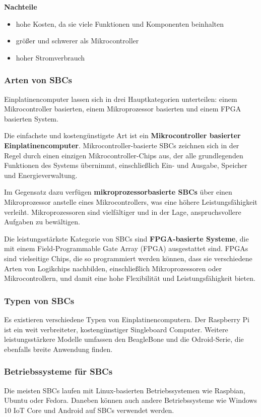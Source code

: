 \textbf{Nachteile}
\begin{itemize}
	\item hohe Kosten, da sie viele Funktionen und Komponenten beinhalten
	\item größer und schwerer als Mikrocontroller
	\item hoher Stromverbrauch
\end{itemize}

\subsubsection{Arten von SBCs}
Einplatinencomputer lassen sich in drei Hauptkategorien unterteilen: einem Mikrocontroller basierten, einem Mikroprozessor basierten und einem FPGA basierten System. 

Die einfachste und kostengünstigste Art ist ein \textbf{Mikrocontroller basierter Einplatinencomputer}. Mikrocontroller-basierte SBCs zeichnen sich in der Regel durch einen einzigen Mikrocontroller-Chips aus, der alle grundlegenden Funktionen des Systems übernimmt, einschließlich Ein- und Ausgabe, Speicher und Energieverwaltung. 

Im Gegensatz dazu verfügen \textbf{mikroprozessorbasierte SBCs} über einen Mikroprozessor anstelle eines Mikrocontrollers, was eine höhere Leistungsfähigkeit verleiht. Mikroprozessoren sind vielfältiger und in der Lage, anspruchsvollere Aufgaben zu bewältigen. 

Die leistungsstärkste Kategorie von SBCs sind \textbf{FPGA-basierte Systeme}, die mit einem Field-Programmable Gate Array (FPGA) ausgestattet sind. FPGAs sind vielseitige Chips, die so programmiert werden können, dass sie verschiedene Arten von Logikchips nachbilden, einschließlich Mikroprozessoren oder Mikrocontrollern, und damit eine hohe Flexibilität und Leistungsfähigkeit bieten.

\subsubsection{Typen von SBCs}
Es existieren verschiedene Typen von Einplatinencomputern. Der Raspberry Pi ist ein weit verbreiteter, kostengünstiger Singleboard Computer. Weitere leistungsstärkere Modelle umfassen den BeagleBone und die Odroid-Serie, die ebenfalls breite Anwendung finden.

\subsubsection{Betriebssysteme für SBCs}
Die meisten SBCs laufen mit Linux-basierten Betriebssystemen wie Raspbian, Ubuntu oder Fedora. Daneben können auch andere Betriebssysteme wie Windows 10 IoT Core und Android auf SBCs verwendet werden. \textcite{EinplatinencomputerSBCs}

